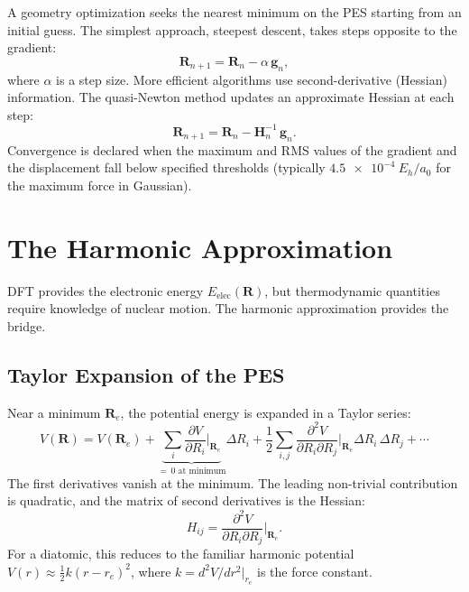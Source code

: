 \documentclass[11pt]{article}
\numberwithin{equation}{section}
\begin{document}
A geometry optimization seeks the nearest minimum on the PES starting from an initial guess. The simplest approach, steepest descent, takes steps opposite to the gradient:
\begin{equation}
\mathbf{R}_{n+1} = \mathbf{R}_n - \alpha\,\mathbf{g}_n,
\end{equation}
where $\alpha$ is a step size. More efficient algorithms use second-derivative (Hessian) information. The quasi-Newton method updates an approximate Hessian at each step:
\begin{equation}
\mathbf{R}_{n+1} = \mathbf{R}_n - \mathbf{H}_n^{-1}\,\mathbf{g}_n.
\label{eq:newton_raphson}
\end{equation}
Convergence is declared when the maximum and RMS values of the gradient and the displacement fall below specified thresholds (typically $\SI{4.5e-4}{E_h/a_0}$ for the maximum force in Gaussian).


\section{The Harmonic Approximation}
\label{sec:harmonic}

DFT provides the electronic energy $E_\text{elec}(\mathbf{R})$, but thermodynamic quantities require knowledge of nuclear motion. The harmonic approximation provides the bridge.

\subsection{Taylor Expansion of the PES}

Near a minimum $\mathbf{R}_e$, the potential energy is expanded in a Taylor series:
\begin{equation}
V(\mathbf{R}) = V(\mathbf{R}_e) + \underbrace{\sum_i \frac{\partial V}{\partial R_i}\bigg|_{\mathbf{R}_e}}_{=\,0\text{ at minimum}} \Delta R_i + \frac{1}{2}\sum_{i,j}\frac{\partial^2 V}{\partial R_i\partial R_j}\bigg|_{\mathbf{R}_e}\Delta R_i\,\Delta R_j + \cdots
\label{eq:taylor}
\end{equation}
The first derivatives vanish at the minimum. The leading non-trivial contribution is quadratic, and the matrix of second derivatives is the Hessian:
\begin{equation}
H_{ij} = \frac{\partial^2 V}{\partial R_i\partial R_j}\bigg|_{\mathbf{R}_e}.
\end{equation}
For a diatomic, this reduces to the familiar harmonic potential $V(r) \approx \frac{1}{2}k(r-r_e)^2$, where $k = d^2V/dr^2|_{r_e}$ is the force constant.
\end{document}
